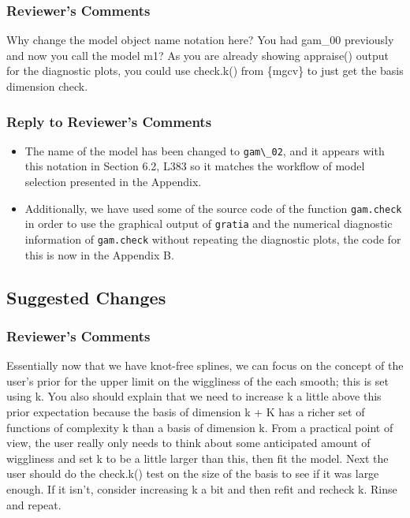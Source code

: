 \documentclass[
]{article}
\newcommand{\passthrough}[1]{#1}
\begin{document}
\hypertarget{reviewers-comments-11}{%
\subsubsection{Reviewer's Comments}\label{reviewers-comments-11}}

Why change the model object name notation here? You had gam\_00 previously and now you call the model m1? As you are already showing appraise() output for the diagnostic plots, you could use check.k() from \{mgcv\} to just get the basis dimension check.

\hypertarget{section-12}{%
\subsubsection{\texorpdfstring{\textcolor{reviewersblue} {Reply to Reviewer's Comments}}{}}\label{section-12}}

\begin{itemize}
\item
  The name of the model has been changed to \passthrough{\lstinline!gam\_02!}, and it appears with this notation in Section 6.2, L383 so it matches the workflow of model selection presented in the Appendix.
\item
  Additionally, we have used some of the source code of the function \passthrough{\lstinline!gam.check!} in order to use the graphical output of \passthrough{\lstinline!gratia!} and the numerical diagnostic information of \passthrough{\lstinline!gam.check!} without repeating the diagnostic plots, the code for this is now in the Appendix B.
\end{itemize}

\hypertarget{suggested-changes}{%
\subsection{Suggested Changes}\label{suggested-changes}}

\hypertarget{reviewers-comments-12}{%
\subsubsection{Reviewer's Comments}\label{reviewers-comments-12}}

Essentially now that we have knot-free splines, we can focus on the concept of the user's prior for the upper limit on the wiggliness of the each smooth; this is set using k. You also should explain that we need to increase k a little above this prior expectation because the basis of dimension k + K has a richer set of functions of complexity k than a basis of dimension k. From a practical point of view, the user really only needs to think about some anticipated amount of wiggliness and set k to be a little larger than this, then fit the model.
Next the user should do the check.k() test on the size of the basis to see if it was large enough. If it isn't, consider increasing k a bit and then refit and recheck k. Rinse and repeat.
\end{document}
